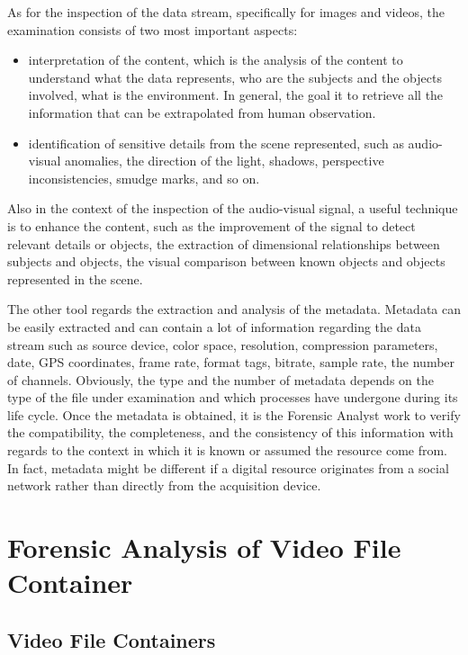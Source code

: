 As for the inspection of the data stream, specifically for images and videos, the examination consists of two most important aspects:
\begin{itemize}
\item interpretation of the content, which is the analysis of the content to understand what the data represents, who are the subjects and the objects involved, what is the environment. In general, the goal it to retrieve all the information that can be extrapolated from human observation.
\item identification of sensitive details from the scene represented, such as audio-visual anomalies, the direction of the light, shadows, perspective inconsistencies, smudge marks, and so on.
\end{itemize}

Also in the context of the inspection of the audio-visual signal, a useful technique is to enhance the content, such as the improvement of the signal to detect relevant details or objects, the extraction of dimensional relationships between subjects and objects, the visual comparison between known objects and objects represented in the scene.

The other tool regards the extraction and analysis of the metadata. Metadata can be easily extracted and can contain a lot of information regarding the data stream such as source device, color space, resolution, compression parameters, date, GPS coordinates, frame rate, format tags, bitrate, sample rate, the number of channels. Obviously, the type and the number of metadata depends on the type of the file under examination and which processes have undergone during its life cycle. Once the metadata is obtained, it is the Forensic Analyst work to verify the compatibility, the completeness, and the consistency \cite{Piva} of this information with regards to the context in which it is known or assumed the resource come from. In fact, metadata might be different if a digital resource originates from a social network rather than directly from the acquisition device.

\section{Forensic Analysis of Video File Container}

\subsection{Video File Containers}

